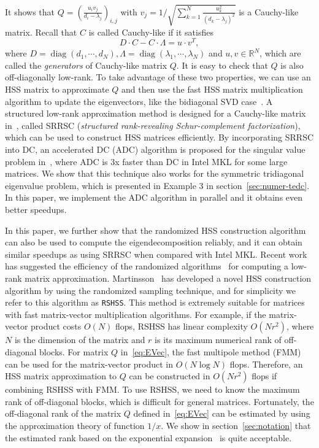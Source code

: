 \documentclass[times]{nlaauth}
\newcommand{\diag}{\mathop{\mathrm{diag}}\nolimits}
\newcounter{algorithm}
\begin{document}
It shows that $Q=\left( \frac{u_i v_j}{d_i-\lambda_j} \right)_{i,j}$ with
$v_j=1/\sqrt{\sum_{k=1}^N \frac{u_k^2}{(d_k-\lambda_j)^2}}$ is a Cauchy-like matrix.
Recall that $C$ is called Cauchy-like if it satisfies
\begin{equation}
\label{eq:cauchylike}
  D\cdotp C-C\cdotp \Lambda=u\cdotp v^T,
\end{equation}
  where $D=\diag(d_1,\cdots, d_N), \Lambda=\diag(\lambda_1,\cdots,\lambda_N)$ and $u, v\in \mathbb{R}^N$,
  which are called the \emph{generators} of Cauchy-like matrix $Q$.
  It is easy to check that $Q$ is also off-diagonally low-rank.
  To take advantage of these two properties, we can use an HSS matrix to approximate $Q$ and then
  use the fast HSS matrix multiplication algorithm to update the eigenvectors, like the bidiagonal SVD case~\cite{Shengguo-SIMAX2}.
A structured low-rank approximation method is designed for
  a Cauchy-like matrix in~\cite{GX-Toeplitz,Shengguo-SIMAX2}, called SRRSC (\emph{structured rank-revealing
  Schur-complement factorization}), which can be used to construct HSS matrices efficiently.
  By incorporating SRRSC into DC, an accelerated DC (ADC) algorithm is proposed for the singular value problem in~\cite{Shengguo-SIMAX2},
  where ADC is 3x faster than DC in Intel MKL for some large matrices.
  We show that this technique also works for the symmetric tridiagonal eigenvalue problem,
  which is presented in Example 3 in section~\ref{sec:numer-tedc}.
  In this paper, we implement the ADC algorithm in parallel and it obtains even better speedups.

  In this paper, we further show that the randomized HSS construction algorithm~\cite{rand-hss} can
  also be used to compute the eigendecomposition reliably, and it can
  obtain similar speedups as using SRRSC when compared with Intel MKL.
  Recent work has suggested the efficiency of the randomized algorithms~\cite{Martinsson-Rev10,Martinsson-PNAS07} for computing a low-rank
  matrix approximation.
  Martinsson~\cite{rand-hss} has developed a novel HSS construction algorithm by using the randomized sampling technique, and
  for simplicity we refer to this algorithm as \texttt{RSHSS}.
  This method is extremely suitable for matrices with fast matrix-vector multiplication algorithms.
  For example, if the matrix-vector product costs $O(N)$ flops, RSHSS
  has linear complexity $O(Nr^2)$, where $N$ is the dimension of the matrix and $r$ is its maximum numerical rank of off-diagonal blocks.
  For matrix $Q$ in~\eqref{eq:EVec}, the fast multipole method (FMM)~\cite{FMM87,Rokhlin88} can be used for the
  matrix-vector product in $O(N \log N)$ flops.
  Therefore, an HSS matrix approximation to $Q$ can be constructed in $O(Nr^2)$ flops if combining RSHSS with FMM.
  To use RSHSS, we need to know the maximum rank of off-diagonal blocks,
  which is difficult for general matrices. Fortunately,
  the off-diagonal rank of the matrix $Q$ defined in~\eqref{eq:EVec} can be estimated by using the approximation theory of function $1/x$.
  We show in section~\ref{sec:notation} that the estimated rank based on the exponential expansion~\cite{hackbusch-exp}
  is quite acceptable.
\end{document}
